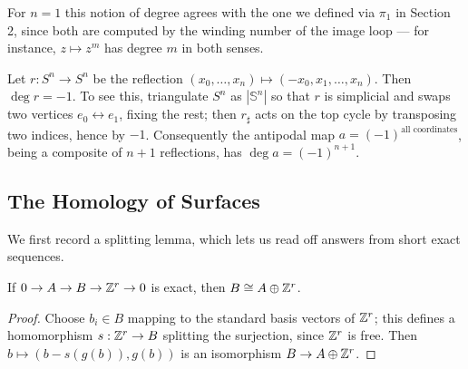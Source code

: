 \documentclass[a4paper]{scrartcl}
\newcommand{\sS}{\mathbb{S}}
\begin{document}
For $n = 1$ this notion of degree agrees with the one we defined via $\pi_1$ in
Section 2, since both are computed by the winding number of the image loop --- for
instance, $z \mapsto z^m$ has degree $m$ in both senses.

\begin{example}
	Let $r: S^n \to S^n$ be the reflection $(x_0,\dots,x_n)\mapsto(-x_0,x_1,\dots,x_n)$. Then $\deg r = -1$. To see this, triangulate $S^n$ as $|\sS^n|$ so that $r$ is simplicial and swaps two vertices $e_0 \leftrightarrow e_1$, fixing the rest; then $r_\sharp$ acts on the top cycle by transposing two indices, hence by $-1$. Consequently the antipodal map $a = (-1)^{\text{all coordinates}}$, being a composite of $n+1$ reflections, has $\deg a = (-1)^{n+1}$.
\end{example}

\subsection{The Homology of Surfaces}

We first record a splitting lemma, which lets us read off answers from short exact
sequences.

\begin{proposition} \label{prop:splitting}
	If $0 \to A \to B \to \mathbb{Z}^r \to 0$ is exact, then $B \cong A \oplus \mathbb{Z}^r$.
\end{proposition}
\begin{proof}
	Choose $b_i \in B$ mapping to the standard basis vectors of $\mathbb{Z}^r$; this defines a homomorphism $s: \mathbb{Z}^r \to B$ splitting the surjection, since $\mathbb{Z}^r$ is free. Then $b \mapsto (b - s(g(b)), g(b))$ is an isomorphism $B \to A \oplus \mathbb{Z}^r$.
\end{proof}
\end{document}
